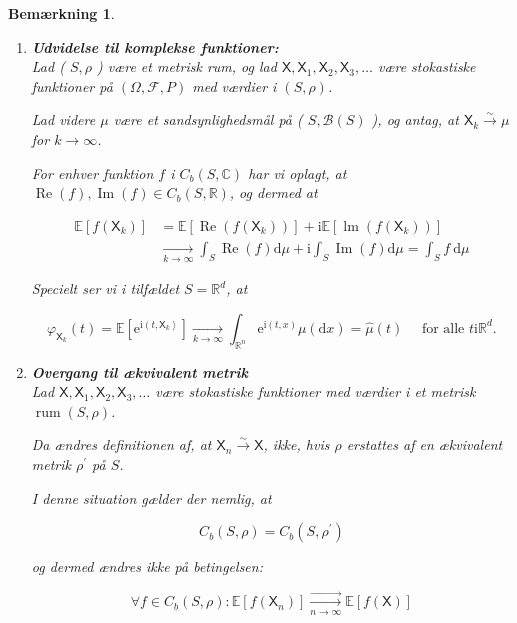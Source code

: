 \documentclass{article}
\newcommand{\1}{\mathbbm{1}}
\newcommand{\X}{\mathsf{X}}
\theoremstyle{boxed}
\newtheorem{remark}[theorem]{Bemærkning}
\begin{document}
\begin{remark}
    \begin{enumerate}
        \item \textbf{Udvidelse til komplekse funktioner:}
        \\Lad ( $S, \rho$ ) være et metrisk rum, og lad $\X, \X_1, \X_2, \X_3, \ldots$ være stokastiske funktioner på $(\Omega, \mathcal{F}, P)$ med værdier i $(S, \rho)$.
        
        Lad videre $\mu$ være et sandsynlighedsmål på ( $S, \mathcal{B}(S)$ ), og antag, at $\X_k \xrightarrow{\sim} \mu$ for $k \rightarrow \infty$.
        
        For enhver funktion $f$ i $C_b(S, \mathbb{C})$ har vi oplagt, at $\operatorname{Re}(f), \operatorname{Im}(f) \in C_b(S, \mathbb{R})$, og dermed at
        
        $$
        \begin{aligned}
        \mathbb{E}\left[f\left(\X_k\right)\right] & =\mathbb{E}\left[\operatorname{Re}\left(f\left(\X_k\right)\right)\right]+\mathrm{i} \mathbb{E}\left[\operatorname{lm}\left(f\left(\X_k\right)\right)\right] \\
        & \xrightarrow[k \rightarrow \infty]{ } \int_S \operatorname{Re}(f) \mathrm{d} \mu+\mathrm{i} \int_S \operatorname{Im}(f) \mathrm{d} \mu=\int_S f \mathrm{~d} \mu
        \end{aligned}
        $$
        
        
        Specielt ser vi i tilfældet $S=\mathbb{R}^d$, at
        
        $$
        \varphi_{\X_k}(t)=\mathbb{E}\left[\mathrm{e}^{\mathrm{i}\left(t, \X_k\right\rangle}\right] \underset{k \rightarrow \infty}{\longrightarrow} \int_{\mathbb{R}^n} \mathrm{e}^{\mathrm{i}(t, x)} \mu(\mathrm{d} x)=\hat{\mu}(t) \quad \text { for alle } t \mathrm{i} \mathbb{R}^d .
        $$
        \item \textbf{Overgang til ækvivalent metrik}
        \\Lad $\mathsf{X}, \mathsf{X}_1, \mathsf{X}_2, \mathsf{X}_3, \ldots$ være stokastiske funktioner med værdier i et metrisk $\operatorname{rum}(S, \rho)$.

        Da ændres definitionen af, at $\X_n \xrightarrow{\sim} \X$, ikke, hvis $\rho$ erstattes af en ækvivalent metrik $\rho^{\prime}$ på $S$.
        
        I denne situation gælder der nemlig, at
        
        $$
        C_b(S, \rho)=C_b\left(S, \rho^{\prime}\right)
        $$
        
        og dermed ændres ikke på betingelsen:
        
        $$
        \forall f \in C_b(S, \rho): \mathbb{E}\left[f\left(\X_n\right)\right] \xrightarrow[n \rightarrow \infty]{\longrightarrow} \mathbb{E}[f(\X)]
        $$
        
    \end{enumerate}
\end{remark}
\end{document}
